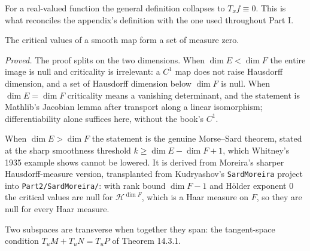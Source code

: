 \begin{proposition}
  \label{prop:14.2.a}
  \leanok
  For a real-valued function the general definition collapses to $T_xf \equiv 0$.
  This is what reconciles the appendix's definition with the one used throughout
  Part I.
\end{proposition}

\begin{theorem}
  \label{thm:14.2.1}
  \leanok
  The critical values of a smooth map form a set of measure zero.

  \emph{Proved.}  The proof splits on the two dimensions.  When
  $\dim E < \dim F$ the entire image is null and criticality is irrelevant: a
  $C^1$ map does not raise Hausdorff dimension, and a set of Hausdorff dimension
  below $\dim F$ is null.  When $\dim E = \dim F$ criticality means a vanishing
  determinant, and the statement is Mathlib's Jacobian lemma after transport
  along a linear isomorphism; differentiability alone suffices here, without the
  book's $C^1$.

  When $\dim E > \dim F$ the statement is the genuine Morse--Sard theorem,
  stated at the sharp smoothness threshold $k \ge \dim E - \dim F + 1$, which
  Whitney's 1935 example shows cannot be lowered.  It is derived from Moreira's
  sharper Hausdorff-measure version, transplanted from Kudryashov's
  \texttt{SardMoreira} project into \texttt{Part2/SardMoreira/}: with rank bound
  $\dim F - 1$ and H\"older exponent $0$ the critical values are null for
  $\mathcal{H}^{\dim F}$, which is a Haar measure on $F$, so they are null for
  every Haar measure.
\end{theorem}

\begin{definition}
  \label{def:14.3}
  \leanok
  Two subspaces are transverse when together they span: the tangent-space
  condition $T_uM + T_uN = T_uP$ of Theorem 14.3.1.
\end{definition}

